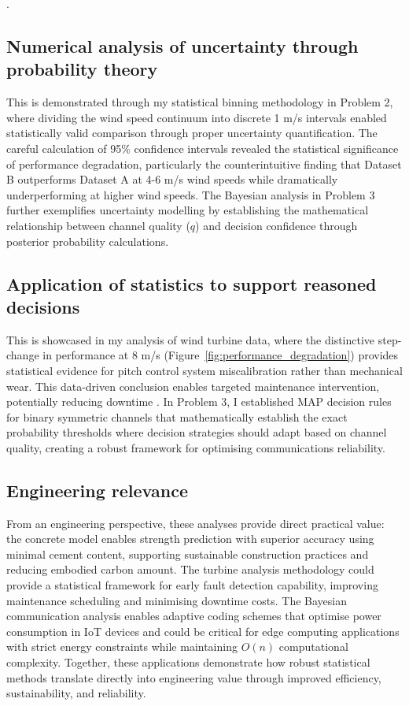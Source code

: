 .\documentclass[a4paper,11pt]{article}
\begin{document}
\subsection*{Numerical analysis of uncertainty through probability theory}
This is demonstrated through my statistical binning methodology in Problem 2, where dividing the wind speed continuum into discrete 1 m/s intervals enabled statistically valid comparison through proper uncertainty quantification. The careful calculation of 95\% confidence intervals revealed the statistical significance of performance degradation, particularly the counterintuitive finding that Dataset B outperforms Dataset A at 4-6 m/s wind speeds while dramatically underperforming at higher wind speeds. The Bayesian analysis in Problem 3 further exemplifies uncertainty modelling by establishing the mathematical relationship between channel quality ($q$) and decision confidence through posterior probability calculations.
\vspace{-10pt}
\subsection*{Application of statistics to support reasoned decisions}
This is showcased in my analysis of wind turbine data, where the distinctive step-change in performance at 8 m/s (Figure~\ref{fig:performance_degradation}) provides statistical evidence for pitch control system miscalibration rather than mechanical wear. This data-driven conclusion enables targeted maintenance intervention, potentially reducing downtime . In Problem 3, I established MAP decision rules for binary symmetric channels that mathematically establish the exact probability thresholds where decision strategies should adapt based on channel quality, creating a robust framework for optimising communications reliability.
\vspace{-10pt}
\subsection*{Engineering relevance}
From an engineering perspective, these analyses provide direct practical value: the concrete model enables strength prediction with superior accuracy using minimal cement content, supporting sustainable construction practices and reducing embodied carbon amount. The turbine analysis methodology could provide a statistical framework for early fault detection capability, improving maintenance scheduling and minimising downtime costs. The Bayesian communication analysis enables adaptive coding schemes that optimise power consumption in IoT devices and could be critical for edge computing applications with strict energy constraints while maintaining $O(n)$ computational complexity. Together, these applications demonstrate how robust statistical methods translate directly into engineering value through improved efficiency, sustainability, and reliability.
\end{document}
